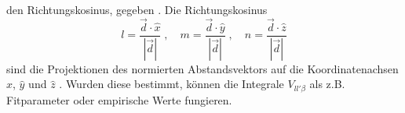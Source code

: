 den Richtungskosinus, gegeben \cite{SC_literature}.
Die Richtungskosinus 
\begin{equation}
    l = \frac{\vec{d} \cdot \hat{x}}{\left | \vec{d} \right |} \; , \quad
    m = \frac{\vec{d} \cdot \hat{y}}{\left | \vec{d} \right |} \; , \quad
    n = \frac{\vec{d} \cdot \hat{z}}{\left | \vec{d} \right |} \label{eqn:RK}
\end{equation}
sind die Projektionen des normierten Abstandsvektors auf die Koordinatenachsen $\hat{x}$, $\hat{y}$ und $\hat{z}$ \cite{SC_literature}.
Wurden diese bestimmt, können die Integrale $V_{ll'\beta}$ als z.B. Fitparameter oder empirische Werte fungieren.
